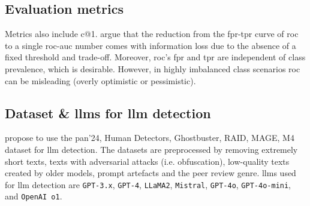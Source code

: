 \subsection{Evaluation metrics}
Metrics also include c@1.
\citet{llm_detection_av_2025} argue that the reduction from the \ac{fpr}-\ac{tpr} curve of \ac{roc} to a single \ac{roc-auc} number 
comes with information loss due to the absence of a fixed threshold and trade-off.
Moreover, \ac{roc}'s \ac{fpr} and \ac{tpr} are independent of class prevalence, which is desirable.
However, in highly imbalanced class scenarios \ac{roc} can be misleading (overly optimistic or pessimistic).

\subsection{Dataset \& \acp{llm} for \ac{llm} detection} 
\citet{llm_detection_av_2025} propose to use the \ac{pan}'24, Human Detectors, Ghostbuster, RAID, MAGE, M4 dataset for \ac{llm} detection.
The datasets are preprocessed by removing extremely short texts, texts with adversarial attacks (i.e. obfuscation), 
low-quality texts created by older models, prompt artefacts and the peer review genre.
\acp{llm} used for \ac{llm} detection are \texttt{GPT-3.x}, \texttt{GPT-4}, \texttt{LLaMA2}, \texttt{Mistral}, \texttt{GPT-4o}, 
\texttt{GPT-4o-mini}, and \texttt{OpenAI o1}.
